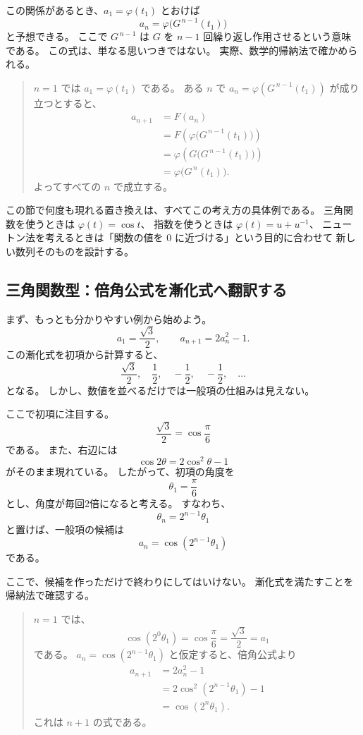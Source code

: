 この関係があるとき、$a_1=\varphi(t_1)$ とおけば
\[
  a_n=\varphi\bigl(G^{\,n-1}(t_1)\bigr)
\]
と予想できる。
ここで $G^{\,n-1}$ は $G$ を $n-1$ 回繰り返し作用させるという意味である。
この式は、単なる思いつきではない。
実際、数学的帰納法で確かめられる。

\begin{quote}
  $n=1$ では $a_1=\varphi(t_1)$ である。
  ある $n$ で $a_n=\varphi(G^{\,n-1}(t_1))$ が成り立つとすると、
  \begin{align*}
    a_{n+1}
      &=F(a_n)\\
      &=F\!\left(\varphi\bigl(G^{\,n-1}(t_1)\bigr)\right)\\
      &=\varphi\!\left(G\bigl(G^{\,n-1}(t_1)\bigr)\right)\\
      &=\varphi\bigl(G^{\,n}(t_1)\bigr).
  \end{align*}
  よってすべての $n$ で成立する。
\end{quote}

この節で何度も現れる置き換えは、すべてこの考え方の具体例である。
三角関数を使うときは $\varphi(t)=\cos t$、
指数を使うときは $\varphi(t)=u+u^{-1}$、
ニュートン法を考えるときは「関数の値を $0$ に近づける」という目的に合わせて
新しい数列そのものを設計する。

\subsection{三角関数型：倍角公式を漸化式へ翻訳する}

まず、もっとも分かりやすい例から始めよう。
\[
  a_1=\frac{\sqrt{3}}{2},
  \qquad
  a_{n+1}=2a_n^2-1 .
  \tag{2.7.2}
\]
この漸化式を初項から計算すると、
\[
  \frac{\sqrt{3}}{2},\quad
  \frac12,\quad
  -\frac12,\quad
  -\frac12,\quad\ldots
\]
となる。
しかし、数値を並べるだけでは一般項の仕組みは見えない。

ここで初項に注目する。
\[
  \frac{\sqrt{3}}{2}=\cos\frac{\pi}{6}
\]
である。
また、右辺には
\[
  \cos 2\theta=2\cos^2\theta-1
  \tag{2.7.3}
\]
がそのまま現れている。
したがって、初項の角度を
\[
  \theta_1=\frac{\pi}{6}
\]
とし、角度が毎回2倍になると考える。
すなわち、
\[
  \theta_n=2^{n-1}\theta_1
\]
と置けば、一般項の候補は
\[
  a_n=\cos\left(2^{n-1}\theta_1\right)
  \tag{2.7.4}
\]
である。

ここで、候補を作っただけで終わりにしてはいけない。
漸化式を満たすことを帰納法で確認する。

\begin{quote}
  $n=1$ では、
  \[
    \cos\left(2^{0}\theta_1\right)=\cos\frac{\pi}{6}
    =\frac{\sqrt{3}}{2}=a_1
  \]
  である。
  $a_n=\cos(2^{n-1}\theta_1)$ と仮定すると、倍角公式より
  \begin{align*}
    a_{n+1}
      &=2a_n^2-1\\
      &=2\cos^2\left(2^{n-1}\theta_1\right)-1\\
      &=\cos\left(2^n\theta_1\right).
  \end{align*}
  これは $n+1$ の式である。
\end{quote}

